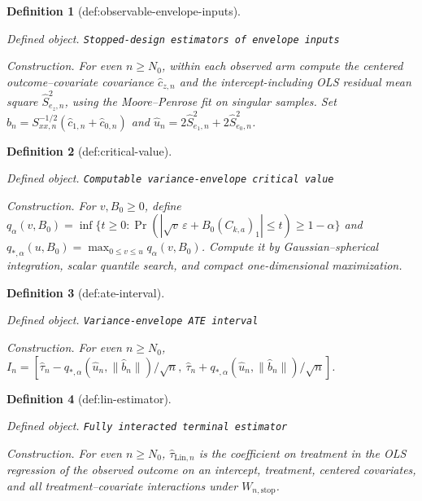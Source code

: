\documentclass{article}
\newtheorem{definition}{Definition}
\begin{document}
\begin{definition}[def:observable-envelope-inputs]\label{def:observable-envelope-inputs}
\par\smallskip\noindent\emph{Defined object.} \texttt{Stopped-\allowbreak{}design estimators of envelope inputs}
\par\smallskip\noindent\emph{Construction.} For even \(n\ge N_0\), within each observed arm compute the centered outcome--covariate covariance \(\widehat c_{z,n}\) and the intercept-including OLS residual mean square \(\widehat S_{e_z,n}^2\), using the Moore--Penrose fit on singular samples. Set \(\widehat b_n=S_{xx,n}^{-1/2}(\widehat c_{1,n}+\widehat c_{0,n})\) and \(\widehat u_n=2\widehat S_{e_1,n}^2+2\widehat S_{e_0,n}^2\).
\end{definition}

\begin{definition}[def:critical-value]\label{def:critical-value}
\par\smallskip\noindent\emph{Defined object.} \texttt{Computable variance-\allowbreak{}envelope critical value}
\par\smallskip\noindent\emph{Construction.} For \(v,B_0\ge0\), define \(q_{\alpha}(v,B_0)=\inf\{t\ge0:\Pr(|\sqrt v\,\varepsilon+B_0(C_{k,a})_1|\le t)\ge1-\alpha\}\) and \(q_{*,\alpha}(u,B_0)=\max_{0\le v\le u}q_{\alpha}(v,B_0)\). Compute it by Gaussian--spherical integration, scalar quantile search, and compact one-dimensional maximization.
\end{definition}

\begin{definition}[def:ate-interval]\label{def:ate-interval}
\par\smallskip\noindent\emph{Defined object.} \texttt{Variance-\allowbreak{}envelope ATE interval}
\par\smallskip\noindent\emph{Construction.} For even \(n\ge N_0\), \(I_n=[\widehat\tau_n-q_{*,\alpha}(\widehat u_n,\|\widehat b_n\|)/\sqrt n,\ \widehat\tau_n+q_{*,\alpha}(\widehat u_n,\|\widehat b_n\|)/\sqrt n]\).
\end{definition}

\begin{definition}[def:lin-estimator]\label{def:lin-estimator}
\par\smallskip\noindent\emph{Defined object.} \texttt{Fully interacted terminal estimator}
\par\smallskip\noindent\emph{Construction.} For even \(n\ge N_0\), \(\widehat\tau_{\mathrm{Lin},n}\) is the coefficient on treatment in the OLS regression of the observed outcome on an intercept, treatment, centered covariates, and all treatment--covariate interactions under \(W_{n,\mathrm{stop}}\).
\end{definition}
\end{document}
